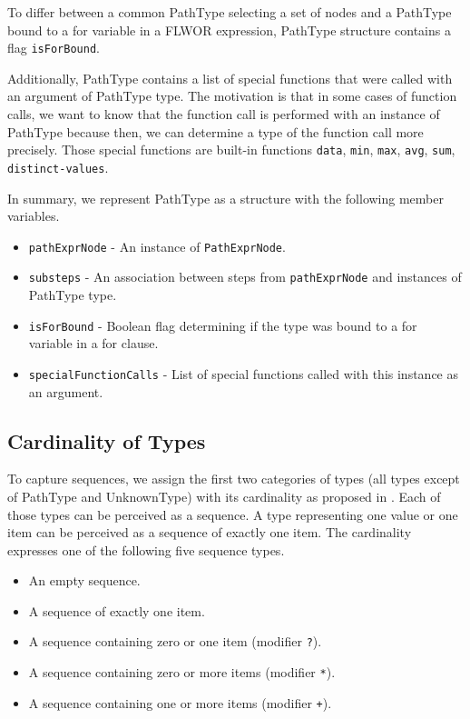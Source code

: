 To differ between a common PathType selecting a set of nodes and a PathType bound to a for variable in a FLWOR expression, PathType structure contains a flag \texttt{isForBound}.

Additionally, PathType contains a list of special functions that were called with an argument of PathType type. The motivation is that in some cases of function calls, we want to know that the function call is performed with an instance of PathType because then, we can determine a type of the function call more precisely. Those special functions are built-in functions \texttt{data}, \texttt{min}, \texttt{max}, \texttt{avg}, \texttt{sum}, \texttt{distinct-values}.

In summary, we represent PathType as a structure with the following member variables.
\begin{itemize}
\item \texttt{pathExprNode} - An instance of \texttt{PathExprNode}.
\item \texttt{substeps} - An association between steps from \texttt{pathExprNode} and instances of PathType type.
\item \texttt{isForBound} - Boolean flag determining if the type was bound to a for variable in a for clause.
\item \texttt{specialFunctionCalls} - List of special functions called with this instance as an argument.
\end{itemize}

\subsection{Cardinality of Types}

To capture sequences, we assign the first two categories of types (all types except of PathType and UnknownType) with its cardinality as proposed in \cite{thesis_schejbal}. Each of those types can be perceived as a sequence. A type representing one value or one item can be perceived as a sequence of exactly one item. The cardinality expresses one of the following five sequence types.

\begin{itemize}
\item An empty sequence.
\item A sequence of exactly one item.
\item A sequence containing zero or one item (modifier \texttt{?}).
\item A sequence containing zero or more items (modifier \texttt{*}).
\item A sequence containing one or more items (modifier \texttt{+}).
\end{itemize}


